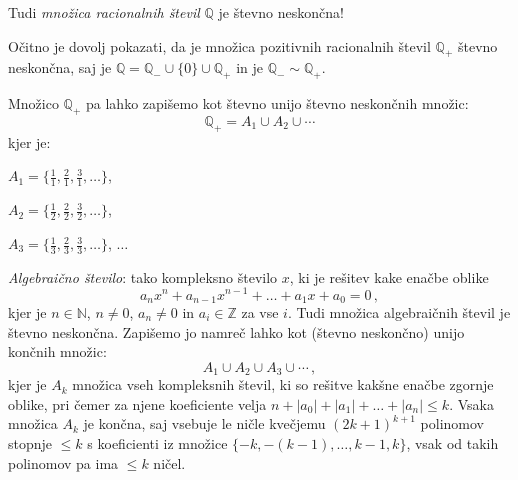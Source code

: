 \documentclass[11pt,paper=b5,footinclude,headinclude]{scrbook} %
\begin{document}
Tudi {\em množica racionalnih števil} $\mathbb{Q}$ je števno neskončna!

Očitno je dovolj pokazati, da je množica pozitivnih racionalnih števil $\mathbb{Q}_+$
 števno neskončna, saj je $\mathbb{Q} = \mathbb{Q}_-\cup \{0\}\cup \mathbb{Q}_+$ in je
$\mathbb{Q}_-\sim \mathbb{Q}_+$.

Množico $\mathbb{Q}_+$ pa lahko zapišemo kot števno unijo števno neskončnih množic:
$$\mathbb{Q}_+ = A_1\cup A_2\cup \cdots$$
kjer je:

$A_1 = \{\frac{1}{1}, \frac{2}{1}, \frac{3}{1}, \ldots\}$,

$A_2 = \{\frac{1}{2}, \frac{2}{2}, \frac{3}{2}, \ldots\}$,

$A_3 = \{\frac{1}{3}, \frac{2}{3}, \frac{3}{3}, \ldots\}$, $\ldots$


{\em Algebraično število}: tako kompleksno število $x$, ki je rešitev kake enačbe oblike
$$a_nx^n+a_{n-1}x^{n-1}+\ldots+a_1x+a_0 = 0\,,$$
kjer je $n\in \mathbb{N}$, $n\neq 0$, $a_n\neq 0$ in $a_i\in \mathbb{Z}$ za vse $i$.
Tudi množica algebraičnih števil je števno neskončna. Zapišemo jo namreč lahko kot
(števno neskončno) unijo končnih množic:
$$A_1\cup A_2\cup A_3\cup \cdots\,,$$
kjer je $A_k$ množica vseh kompleksnih števil, ki so rešitve
kakšne enačbe zgornje oblike, pri čemer za njene koeficiente velja
$n+|a_0|+|a_1|+\ldots+|a_n|\le k$.
Vsaka množica $A_k$ je končna, saj vsebuje le ničle kvečjemu
$(2k+1)^{k+1}$ polinomov stopnje $\le k$ s koeficienti iz množice $\{-k,-(k-1), \ldots, k-1,k\}$, vsak od takih polinomov pa ima
$\le k$ ničel.



%
%
\end{document}
